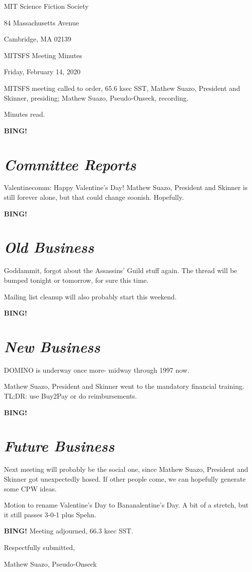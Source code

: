 \documentclass[10pt]{article}
\newcommand{\bing}{{\bf BING!} }
\newcommand{\goto}[1]{\bing \vskip 12pt \section*{{\em{#1}}}}
\newcommand{\ps}{ plus Spehn\xspace}
\newcommand{\skinner}{Mathew Suazo, President and Skinner\xspace}
\newcommand{\onseck}{Mathew Suazo, Pseudo-Onseck\xspace}
\newcommand{\meetingdate}{Friday, February 14, 2020}
\begin{document}
\begin{center}

MIT Science Fiction Society

84 Massachusetts Avenue

Cambridge, MA 02139

\vspace{12pt}

MITSFS Meeting Minutes

\meetingdate

\end{center}

\vspace{18pt}

\setlength{\parskip}{6pt}

\noindent
MITSFS meeting called to order, 65.6 ksec SST,
\skinner, presiding; \onseck, recording.

Minutes read.

\goto{Committee Reports}

Valentinecomm: Happy Valentine's Day! \skinner is still forever alone, but that could change soonish. Hopefully.

\goto{Old Business}

Goddammit, forgot about the Assassins' Guild stuff again. The thread will be bumped tonight or tomorrow, for sure this time.

Mailing list cleanup will also probably start this weekend.

\goto{New Business}

DOMINO is underway once more- midway through 1997 now.

\skinner went to the mandatory financial training. TL;DR: use Buy2Pay or do reimbursements.

\goto{Future Business}

Next meeting will probably be the social one, since \skinner got unexpectedly hosed. If other people come, we can hopefully generate some CPW ideas.

Motion to rename Valentine's Day to Bananalentine's Day. A bit of a stretch, but it still passes 3-0-1 \ps.

\bing
\noindent
Meeting adjourned, 66.3 ksec SST.

\vspace{18pt}

\centerline{Respectfully submitted,}
\centerline{\onseck}
\end{document}
